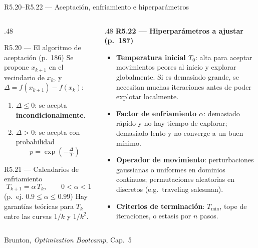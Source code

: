 \documentclass[10pt,aspectratio=169]{beamer}
\newcommand{\fuente}{\vfill{\scriptsize\color{gray}Brunton, \emph{Optimization Bootcamp}, Cap.~5}}
\begin{document}
\begin{frame}{R5.20--R5.22 --- Aceptación, enfriamiento e hiperparámetros}
  \small
  \begin{columns}[T,onlytextwidth]
    \begin{column}{.48\textwidth}
      \begin{block}{R5.20 --- El algoritmo de aceptación (p.~186)}
        \small
        Se propone $x_{k+1}$ en el vecindario de $x_k$, y
        $\Delta = f(x_{k+1})-f(x_k)$:
        \begin{enumerate}
          \item $\Delta \le 0$: se acepta \textbf{incondicionalmente}.
          \item $\Delta > 0$: se acepta con probabilidad
            \[
              p = \exp\!\left(-\tfrac{\Delta}{T}\right)
            \]
        \end{enumerate}
      \end{block}
      \begin{block}{R5.21 --- Calendarios de enfriamiento}
        \small
        \[
          T_{k+1} = \alpha\, T_k,\qquad 0<\alpha<1
        \]
        \vspace{-2mm}
        {\scriptsize (p.~ej. $0.9 \le \alpha \le 0.99$)}
        Hay garantías teóricas para $T_k$ entre las curvas $1/k$ y $1/k^2$.
      \end{block}
    \end{column}
    \begin{column}{.48\textwidth}
      \textbf{R5.22 --- Hiperparámetros a ajustar (p.~187)}
      \begin{itemize}
        \item \textbf{Temperatura inicial $T_0$}: alta para aceptar
          movimientos peores al inicio y explorar globalmente. Si es demasiado
          grande, se necesitan muchas iteraciones antes de poder explotar
          localmente.
        \item \textbf{Factor de enfriamiento $\alpha$}: demasiado rápido y no
          hay tiempo de explorar; demasiado lento y no converge a un buen
          mínimo.
        \item \textbf{Operador de movimiento}: perturbaciones gaussianas o
          uniformes en dominios continuos; permutaciones aleatorias en
          discretos (e.g.~traveling salesman).
        \item \textbf{Criterios de terminación}: $T_{\min}$, tope de
          iteraciones, o estasis por $n$ pasos.
      \end{itemize}
    \end{column}
  \end{columns}
  \fuente
\end{frame}
\end{document}

